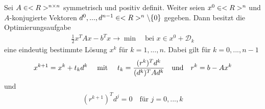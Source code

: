 \begin{lemma}
	Sei $A\in<R>^{n \times n}$ symmetrisch und positiv definit. Weiter seien $x^0\in<R>^n$ und $A$-konjugierte Vektoren $d^0,...,d^{n-1}\in<R>^n\backslash\{0\}$ gegeben. Dann besitzt die Optimierungsaufgabe
	\begin{align}
		\label{2_15}
		\frac{1}{2}x^TAx-b^Tx\to\min\quad\text{bei } x\in x^0+\mathcal{D}_k
	\end{align}
	eine eindeutig bestimmte Lösung $x^k$ für $k=1,...,n$. Dabei gilt für $k=0,...,n-1$
	\begin{align}
		\label{2_16}
		x^{k+1} = x^k + t_kd^k\quad\mit\quad t_k = \frac{(r^k)^Td^k}{(d^k)^TAd^k}\quad\text{und}\quad r^k=b-Ax^k
	\end{align}
	und
	\begin{align}
		\label{2_17}
		(r^{k+1})^Td^j = 0\quad\text{für } j=0,...,k
	\end{align}
\end{lemma}
